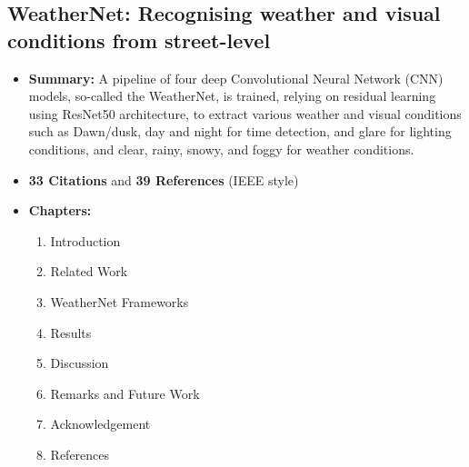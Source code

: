 \documentclass[11pt]{article}
\begin{document}
    \subsection{WeatherNet: Recognising weather and visual conditions from street-level \cite{DBLP:journals/corr/abs-1910-09910}}
    \begin{itemize}
        \item \textbf{Summary:} A pipeline of four deep Convolutional Neural Network (CNN) models, so-called 
            the WeatherNet, is trained, relying on residual learning using ResNet50 architecture, to extract 
            various weather and visual conditions such as Dawn/dusk, day and night for time detection, and 
            glare for lighting conditions, and clear, rainy, snowy, and foggy for weather conditions.
        \item \textbf{33 Citations} and \textbf{39 References} (IEEE style)
        \item \textbf{Chapters:}
            \begin{enumerate}
                \item Introduction
                \item Related Work
                \item WeatherNet Frameworks 
                \item Results 
                \item Discussion 
                \item Remarks and Future Work
                \item Acknowledgement
                \item References
            \end{enumerate}
    \end{itemize}
\end{document}
